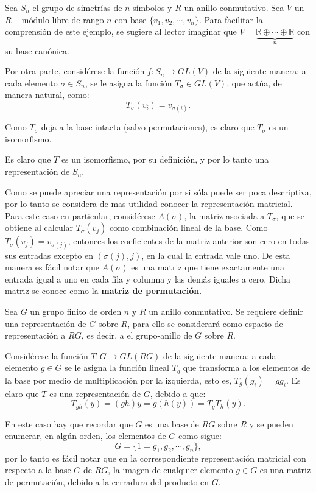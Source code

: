 \begin{ejemplo}
Sea $S_n$ el grupo de simetrías de $n$ símbolos y $R$ un anillo conmutativo. Sea $V$ un $R-\mbox{módulo}$ libre de rango $n$ con base $\{v_1, v_2, \cdots, v_n\}$. Para facilitar la comprensión de este ejemplo, se sugiere al lector imaginar que $V = \underset{n}{\underbrace{\mathds{R} \oplus \cdots \oplus \mathds{R}}}$ con su base canónica. 

Por otra parte, considérese la función $f \colon S_n \to GL(V)$ de la siguiente manera: a cada elemento $\sigma 
\in S_n$, se le asigna la función $T_{\sigma} \in GL(V)$, que actúa, de manera natural, como:
\begin{equation*}
T_{\sigma}(v_i) = v_{\sigma(i)}.
\end{equation*}

Como $T_{\sigma}$ deja a la base intacta (salvo permutaciones), es claro que $T_\sigma$ es un isomorfismo. 

 
Es claro que $T$ es un isomorfismo, por su definición, y por lo tanto una representación de $S_n$.

Como se puede apreciar una representación por si sóla puede ser poca descriptiva, por lo tanto se considera de mas utilidad conocer la representación matricial. Para este caso en particular, considérese $A(\sigma)$, la matriz asociada a $T_{\sigma}$, que se obtiene al calcular $T_{\sigma}(v_j)$ como combinación lineal de la base. Como $T_{\sigma} (v_j) = v_{\sigma(j)}$, entonces los coeficientes de la matriz anterior son cero en todas sus entradas excepto en $(\sigma(j),j)$, en la cual la entrada vale uno. De esta manera es fácil notar que $A(\sigma)$ es una matriz que tiene exactamente una entrada igual a uno en cada fila y columna y las demás iguales a cero. Dicha matriz se conoce como la \textbf{matriz de permutación}.
\end{ejemplo}
\begin{ejemplo}
Sea $G$ un grupo finito de orden $n$ y $R$ un anillo conmutativo. Se requiere definir una representación de $G$ sobre $R$, para ello se considerará  como espacio de representación a $RG$, es decir, a el grupo-anillo de $G$ sobre $R$. 

Considérese la función $T \colon G \to GL(RG)$ de la siguiente manera: a cada elemento $g \in G$ se le asigna la función lineal $T_g$ que transforma a los elementos de la base por medio de multiplicación por la izquierda, esto es, $T_g(g_i) = gg_i$. Es claro que $T$ es una representación de $G$, debido a que:
\begin{equation*} T_{gh}(y) = (gh)y = g(h(y)) = T_gT_h(y).  \end{equation*}

 
En este caso hay que recordar que $G$ es una base de $RG$ sobre $R$ y se pueden enumerar, en algún orden, los elementos de $G$ como sigue:
\begin{equation*} 
G = \{ 1=g_1, g_2, \cdots, g_n \}, 
\end{equation*}  por lo tanto es fácil notar que en la correspondiente representación matricial con respecto a la base $G$ de $RG$, la imagen de cualquier elemento $g \in G$ es una matriz de permutación, debido a la cerradura del producto en $G$. 
\end{ejemplo}
